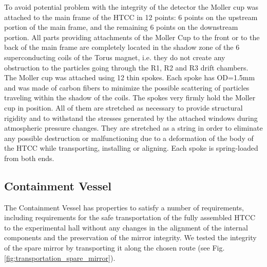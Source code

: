 To avoid potential problem with the integrity of the detector the Moller cup was attached to the main frame of the HTCC in 12 points: 6 points on the upstream portion of the main frame, and the remaining 6 points on the downstream portion. All parts providing attachments of the Moller Cup to the front or to the back of the main frame are completely located in the shadow zone of the 6 superconducting coils of the Torus magnet, i.e. they do not create any obstruction to the particles going through the R1, R2 and R3 drift chambers. The Moller cup was attached using 12 thin spokes. Each spoke has OD=1.5mm and was made of carbon fibers to minimize the possible scattering of particles traveling within the shadow of the coils. The spokes very firmly hold the Moller cup in position. All of them are stretched as necessary to provide structural rigidity and to withstand the stresses generated by the attached windows during atmospheric pressure changes. They are stretched as a string in order to eliminate any possible destruction or malfunctioning due to a deformation of the body of the HTCC while transporting, installing or aligning. Each spoke is spring-loaded from both ends.

\subsection{Containment Vessel}

\indent The Containment Vessel has properties to satisfy a number of requirements, including requirements for the safe transportation of the fully assembled HTCC to the experimental hall without any changes in the alignment of the internal components and the preservation of the mirror integrity. We tested the integrity of the spare mirror by transporting it along the chosen route (see Fig.\ref{fig:transportation_spare_mirror}).

